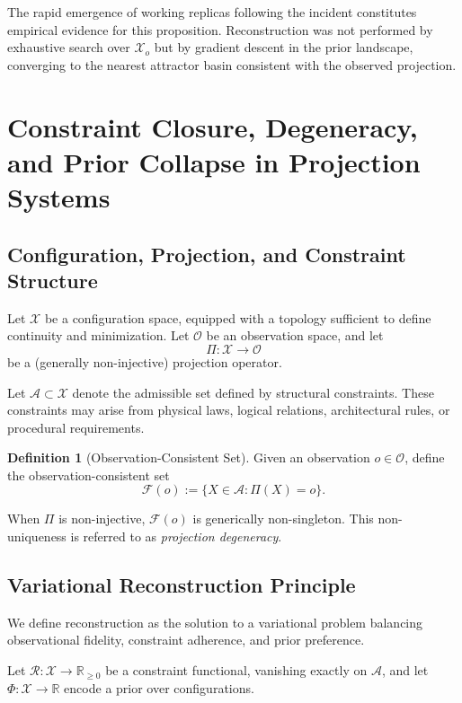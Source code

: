 \documentclass[12pt, oneside]{article}
\theoremstyle{plain}
\theoremstyle{definition}
\newtheorem{definition}[theorem]{Definition}
\theoremstyle{remark}
\newcommand{\config}{\mathcal{X}}
\begin{document}
The rapid emergence of working replicas following the incident constitutes empirical evidence
for this proposition. Reconstruction was not performed by exhaustive search over $\config_o$
but by gradient descent in the prior landscape, converging to the nearest attractor basin
consistent with the observed projection.

\section{Constraint Closure, Degeneracy, and Prior Collapse in Projection Systems}

\subsection{Configuration, Projection, and Constraint Structure}

Let $\mathcal{X}$ be a configuration space, equipped with a topology sufficient to define continuity and minimization. Let $\mathcal{O}$ be an observation space, and let
\[
\Pi : \mathcal{X} \to \mathcal{O}
\]
be a (generally non-injective) projection operator.

Let $\mathcal{A} \subset \mathcal{X}$ denote the admissible set defined by structural constraints. These constraints may arise from physical laws, logical relations, architectural rules, or procedural requirements.

\begin{definition}[Observation-Consistent Set]
Given an observation $o \in \mathcal{O}$, define the observation-consistent set
\[
\mathcal{F}(o) := \{ X \in \mathcal{A} : \Pi(X) = o \}.
\]
\end{definition}

When $\Pi$ is non-injective, $\mathcal{F}(o)$ is generically non-singleton. This non-uniqueness is referred to as \emph{projection degeneracy}.

\subsection{Variational Reconstruction Principle}

We define reconstruction as the solution to a variational problem balancing observational fidelity, constraint adherence, and prior preference.

Let $\mathcal{R} : \mathcal{X} \to \mathbb{R}_{\ge 0}$ be a constraint functional, vanishing exactly on $\mathcal{A}$, and let $\Phi : \mathcal{X} \to \mathbb{R}$ encode a prior over configurations.
\end{document}
